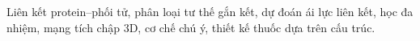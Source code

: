 \documentclass[10pt, conference, a4paper, compsocconf]{IEEEtran}
\begin{document}
\begin{IEEEkeywords}
Liên kết protein--phối tử, phân loại tư thế gắn kết, dự đoán ái lực liên kết, học đa nhiệm, mạng tích chập 3D, cơ chế chú ý, thiết kế thuốc dựa trên cấu trúc.
\end{IEEEkeywords}



%
\IEEEpeerreviewmaketitle











%
%
%
\end{document}
